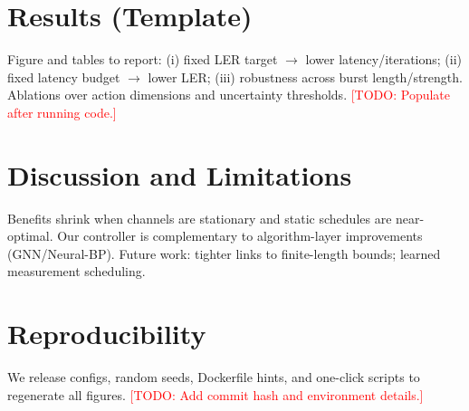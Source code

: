 \documentclass[conference]{IEEEtran}
\newcommand{\todo}[1]{\textcolor{red}{[TODO: #1]}}
\begin{document}
\section{Results (Template)}
Figure and tables to report: (i) fixed LER target $\to$ lower latency/iterations; (ii) fixed latency budget $\to$ lower LER; (iii) robustness across burst length/strength. Ablations over action dimensions and uncertainty thresholds. \todo{Populate after running code.}

\section{Discussion and Limitations}
Benefits shrink when channels are stationary and static schedules are near-optimal. Our controller is complementary to algorithm-layer improvements (GNN/Neural-BP). Future work: tighter links to finite-length bounds; learned measurement scheduling.

\section{Reproducibility}
We release configs, random seeds, Dockerfile hints, and one-click scripts to regenerate all figures. \todo{Add commit hash and environment details.}



\end{document}
